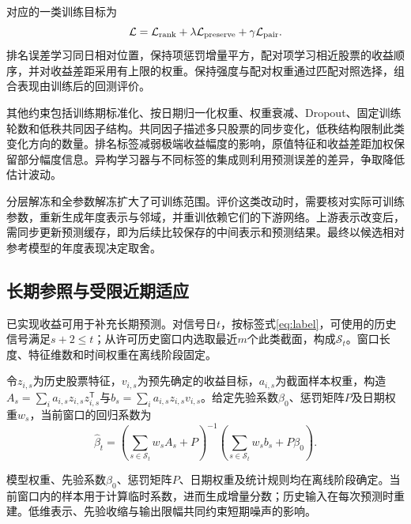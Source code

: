 \documentclass[UTF8,11pt,a4paper,fontset=fandol]{ctexart}
\begin{document}
对应的一类训练目标为
\begin{equation}
 \mathcal L=\mathcal L_{\rm rank}
 +\lambda\mathcal L_{\rm preserve}
 +\gamma\mathcal L_{\rm pair}.
 \label{eq:loss}
\end{equation}
排名误差学习同日相对位置，保持项惩罚增量平方，配对项学习相近股票的收益顺序，并对收益差距采用有上限的权重。保持强度与配对权重通过匹配对照选择，组合表现由训练后的回测评价。

其他约束包括训练期标准化、按日期归一化权重、权重衰减、Dropout、固定训练轮数和低秩共同因子结构。共同因子描述多只股票的同步变化，低秩结构限制此类变化方向的数量。排名标签减弱极端收益幅度的影响，原值特征和收益差距加权保留部分幅度信息。异构学习器与不同标签的集成则利用预测误差的差异，争取降低估计波动。

分层解冻和全参数解冻扩大了可训练范围。评价这类改动时，需要核对实际可训练参数，重新生成年度表示与邻域，并重训依赖它们的下游网络。上游表示改变后，需同步更新预测缓存，即为后续比较保存的中间表示和预测结果。最终以候选相对参考模型的年度表现决定取舍。

\subsection{长期参照与受限近期适应}\label{sec:adaptation}
已实现收益可用于补充长期预测。对信号日$t$，按标签式\eqref{eq:label}，可使用的历史信号满足$s+2\leq t$；从许可历史窗口内选取最近$m$个此类截面，构成$\mathcal S_t$。窗口长度、特征维数和时间权重在离线阶段固定。

\begin{samepage}
令$z_{i,s}$为历史股票特征，$v_{i,s}$为预先确定的收益目标，$a_{i,s}$为截面样本权重，构造$A_s=\sum_i a_{i,s}z_{i,s}z_{i,s}^{\mathsf T}$与$b_s=\sum_i a_{i,s}z_{i,s}v_{i,s}$。给定先验系数$\beta_0$、惩罚矩阵$P$及日期权重$w_s$，当前窗口的回归系数为
\begin{equation}
 \widehat\beta_t=(\sum_{s\in\mathcal S_t} w_sA_s+P)^{-1}
                  (\sum_{s\in\mathcal S_t} w_sb_s+P\beta_0).
 \label{eq:ridge}
\end{equation}
\end{samepage}
模型权重、先验系数$\beta_0$、惩罚矩阵$P$、日期权重及统计规则均在离线阶段确定。当前窗口内的样本用于计算临时系数，进而生成增量分数；历史输入在每次预测时重建。低维表示、先验收缩与输出限幅共同约束短期噪声的影响。
\end{document}

